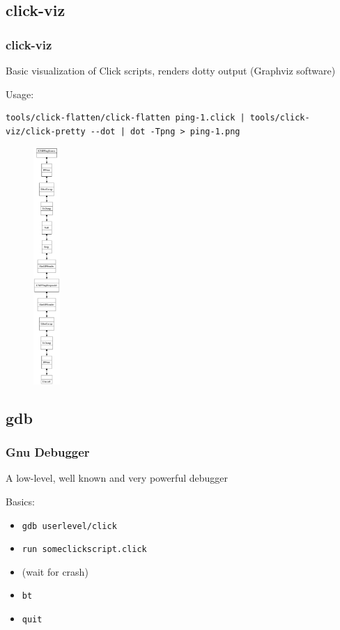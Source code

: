 \documentclass{beamer}
\begin{document}
\subsection{click-viz} %
\label{sub:click_viz}

\begin{frame}[fragile]
\frametitle{click-viz}
\begin{minipage}[t]{0.7\linewidth}

Basic visualization of Click scripts, renders dotty output (Graphviz software)

Usage:
\begin{lstlisting}
tools/click-flatten/click-flatten ping-1.click | tools/click-viz/click-pretty --dot | dot -Tpng > ping-1.png
\end{lstlisting}

\end{minipage}
\begin{minipage}[t]{0.15\linewidth}
\begin{figure}[t]
	\centering
	\includegraphics[width=1cm]{figures/clickvizcropped.pdf}
\end{figure}
\end{minipage}

\end{frame}

\subsection{gdb} %
\label{sub:gdb}

\begin{frame}
\frametitle{Gnu Debugger}
A low-level, well known and very powerful debugger

Basics:
\begin{itemize}
	\item \lstinline!gdb userlevel/click!
	\item \lstinline!run someclickscript.click!
	\item (wait for crash)
	\item \lstinline!bt!
	\item \lstinline!quit!
\end{itemize}
\end{frame}
\end{document}
